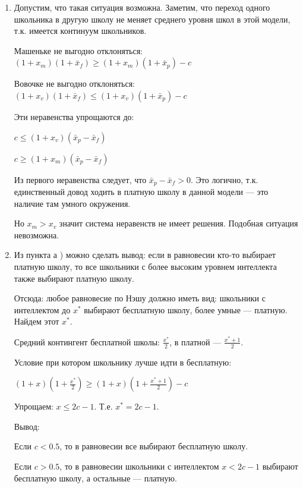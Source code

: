 \begin{problem}
\begin{sol}
\begin{enumerate}
\item Допустим, что такая ситуация возможна. Заметим, что переход одного школьника в другую школу не меняет среднего уровня школ в этой модели, т.к. имеется континуум школьников. \par
Машеньке не выгодно отклоняться: $(1+x_{m})(1+\bar{x}_{f})\ge (1+x_{m})(1+\bar{x}_{p})-c$ \par
Вовочке не выгодно отклоняться: $(1+x_{v})(1+\bar{x}_{f})\le (1+x_{v})(1+\bar{x}_{p})-c$ \par
Эти неравенства упрощаются до: \par
$c\le (1+x_{v})(\bar{x}_{p}-\bar{x}_{f})$ \par
$c\ge (1+x_{m})(\bar{x}_{p}-\bar{x}_{f})$ \par
Из первого неравенства следует, что $\bar{x}_{p}-\bar{x}_{f}>0$. Это логично, т.к. единственный довод ходить в платную школу в данной модели --- это наличие там умного окружения. \par
Но $x_{m}>x_{v}$ значит система неравенств не имеет решения. Подобная ситуация невозможна. \par
\item Из пункта а ) можно сделать вывод: если в равновесии кто-то выбирает платную школу, то все школьники с более высоким уровнем интеллекта также выбирают платную школу. \par
Отсюда: любое равновесие по Нэшу должно иметь вид: школьники с интеллектом до $x^{*}$ выбирают бесплатную школу, более умные --- платную. Найдем этот $x^{*}$. \par
Средний контингент бесплатной школы: $\frac{x^{*}}{2}$, в платной --- $\frac{x^{*}+1}{2}$. \par
Условие при котором школьнику лучше идти в бесплатную: \par
$(1+x)(1+\frac{x^{*}}{2})\ge (1+x)(1+\frac{x^{*}+1}{2})-c$ \par
Упрощаем: $x\le 2c-1$. Т.е. $x^{*}=2c-1$. \par
Вывод: \par
Если $c<0.5$, то в равновесии все выбирают бесплатную школу. \par
Если $c>0.5$, то в равновесии школьники с интеллектом $x<2c-1$ выбирают бесплатную школу, а остальные --- платную.
\end{enumerate}
\end{sol}
\end{problem}








